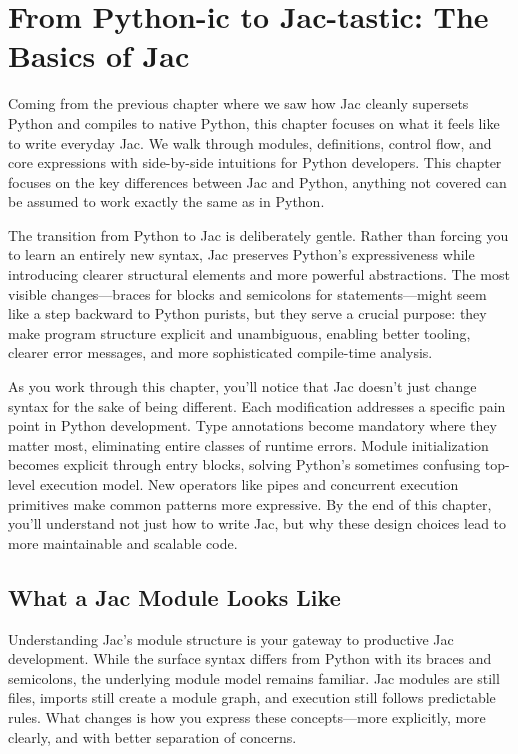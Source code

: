 \chapter{From Python-ic to Jac-tastic: The Basics of Jac}

Coming from the previous chapter where we saw how Jac cleanly supersets Python and compiles to native Python, this chapter focuses on what it feels like to write everyday Jac. We walk through modules, definitions, control flow, and core expressions with side-by-side intuitions for Python developers. This chapter focuses on the key differences between Jac and Python, anything not covered can be assumed to work exactly the same as in Python.

The transition from Python to Jac is deliberately gentle. Rather than forcing you to learn an entirely new syntax, Jac preserves Python's expressiveness while introducing clearer structural elements and more powerful abstractions. The most visible changes—braces for blocks and semicolons for statements—might seem like a step backward to Python purists, but they serve a crucial purpose: they make program structure explicit and unambiguous, enabling better tooling, clearer error messages, and more sophisticated compile-time analysis.

As you work through this chapter, you'll notice that Jac doesn't just change syntax for the sake of being different. Each modification addresses a specific pain point in Python development. Type annotations become mandatory where they matter most, eliminating entire classes of runtime errors. Module initialization becomes explicit through entry blocks, solving Python's sometimes confusing top-level execution model. New operators like pipes and concurrent execution primitives make common patterns more expressive. By the end of this chapter, you'll understand not just how to write Jac, but why these design choices lead to more maintainable and scalable code.

\section{What a Jac Module Looks Like}

Understanding Jac's module structure is your gateway to productive Jac development. While the surface syntax differs from Python with its braces and semicolons, the underlying module model remains familiar. Jac modules are still files, imports still create a module graph, and execution still follows predictable rules. What changes is how you express these concepts—more explicitly, more clearly, and with better separation of concerns.

